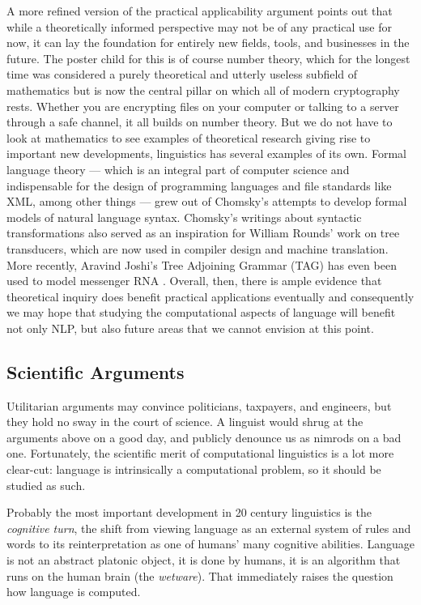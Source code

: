 A more refined version of the practical applicability argument points out that while a theoretically informed perspective may not be of any practical use for now, it can lay the foundation for entirely new fields, tools, and businesses in the future.
The poster child for this is of course number theory, which for the longest time was considered a purely theoretical and utterly useless subfield of mathematics but is now the central pillar on which all of modern cryptography rests.
Whether you are encrypting files on your computer or talking to a server through a safe channel, it all builds on number theory.
But we do not have to look at mathematics to see examples of theoretical research giving rise to important new developments, linguistics has several examples of its own.
Formal language theory --- which is an integral part of computer science and indispensable for the design of programming languages and file standards like XML, among other things --- grew out of Chomsky's attempts to develop formal models of natural language syntax.
Chomsky's writings about syntactic transformations also served as an inspiration for William Rounds' \citep{Rounds70} work on tree transducers, which are now used in compiler design and machine translation.
More recently, Aravind Joshi's Tree Adjoining Grammar (TAG) has even been used to model messenger RNA \citep{Uemura.etal99, Matsui.etal05}.
Overall, then, there is ample evidence that theoretical inquiry does benefit practical applications eventually and consequently we may hope that studying the computational aspects of language will benefit not only NLP, but also future areas that we cannot envision at this point.

\subsection{Scientific Arguments}

Utilitarian arguments may convince politicians, taxpayers, and engineers, but they hold no sway in the court of science.
A linguist would shrug at the arguments above on a good day, and publicly denounce us as nimrods on a bad one.
Fortunately, the scientific merit of computational linguistics is a lot more clear-cut: language is intrinsically a computational problem, so it should be studied as such.

Probably the most important development in 20 century linguistics is the \emph{cognitive turn}, the shift from viewing language as an external system of rules and words to its reinterpretation as one of humans' many cognitive abilities.
Language is not an abstract platonic object, it is done by humans, it is an algorithm that runs on the human brain (the \emph{wetware}).
That immediately raises the question how language is computed.

